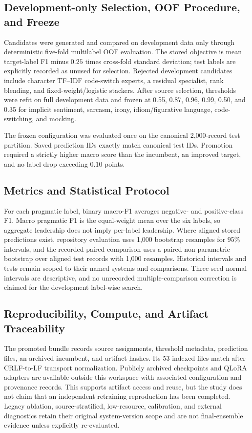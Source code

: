 \subsection{Development-only Selection, OOF Procedure, and Freeze}

Candidates were generated and compared on development data only through deterministic five-fold multilabel OOF evaluation. The stored objective is mean target-label F1 minus $0.25$ times cross-fold standard deviation; test labels are explicitly recorded as unused for selection. Rejected development candidates include character TF--IDF code-switch experts, a residual specialist, rank blending, and fixed-weight/logistic stackers. After source selection, thresholds were refit on full development data and frozen at 0.55, 0.87, 0.96, 0.99, 0.50, and 0.35 for implicit sentiment, sarcasm, irony, idiom/figurative language, code-switching, and mocking.

The frozen configuration was evaluated once on the canonical 2,000-record test partition. Saved prediction IDs exactly match canonical test IDs. Promotion required a strictly higher macro score than the incumbent, an improved target, and no label drop exceeding 0.10 points.

\subsection{Metrics and Statistical Protocol}

For each pragmatic label, binary macro-F1 averages negative- and positive-class F1. Macro pragmatic F1 is the equal-weight mean over the six labels, so aggregate leadership does not imply per-label leadership. Where aligned stored predictions exist, repository evaluation uses 1,000 bootstrap resamples for 95\% intervals, and the recorded paired comparison uses a paired non-parametric bootstrap over aligned test records with 1,000 resamples. Historical intervals and tests remain scoped to their named systems and comparisons. Three-seed normal intervals are descriptive, and no unrecorded multiple-comparison correction is claimed for the development label-wise search.

\subsection{Reproducibility, Compute, and Artifact Traceability}

The promoted bundle records source assignments, threshold metadata, prediction files, an archived incumbent, and artifact hashes. Its 53 indexed files match after CRLF-to-LF transport normalization. Publicly archived checkpoints and QLoRA adapters are available outside this workspace with associated configuration and provenance records. This supports artifact access and reuse, but the study does not claim that an independent retraining reproduction has been completed. Legacy ablation, source-stratified, low-resource, calibration, and external diagnostics retain their original system-version scope and are not final-ensemble evidence unless explicitly re-evaluated.
